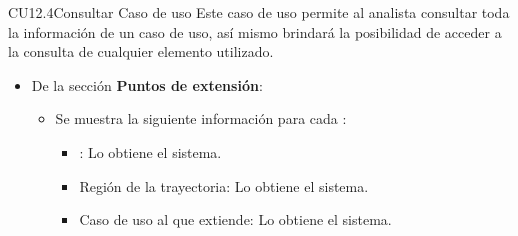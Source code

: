 \begin{UseCase}{CU12.4}{Consultar Caso de uso}{
		Este caso de uso permite al analista consultar toda la información de un caso de uso, así mismo brindará la posibilidad de acceder a la consulta de cualquier elemento utilizado.
	}
{\begin{itemize}
\begin{itemize}
							\begin{itemize}
								\item {}: Lo obtiene el sistema.
								\item {} Lo obtiene el sistema.
								\item {} Lo obtiene el sistema.
								\item Se muestra la siguiente información para cada :
									\begin{itemize}
										\item {}: Lo obtiene el sistema.
										\item {}: Lo obtiene el sistema.
										\item {} Lo obtiene el sistema.
									\end{itemize}
								\item {} Lo obtiene el sistema.
							\end{itemize}
						\item De la sección \textbf{Puntos de extensión}:
							\begin{itemize}
								\item Se muestra la siguiente información para cada :
									\begin{itemize}
										\item {}: Lo obtiene el sistema.
										\item Región de la trayectoria: Lo obtiene el sistema.
										\item Caso de uso al que extiende: Lo obtiene el sistema.
									\end{itemize}
							\end{itemize}
					\end{itemize}
		\end{itemize}}
	\end{UseCase}
